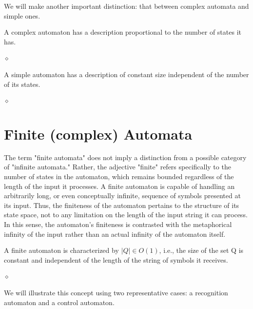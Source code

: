We will make another important distinction: that between complex automata and simple ones.

\begin{definition}
A complex automaton has a description proportional to the number of states it has.

$\diamond$
\end{definition}

\begin{definition}
A simple automaton has a description of constant size independent of the number of its states.

$\diamond$
\end{definition}

\section{Finite (complex) Automata}
The term "finite automata" does not imply a distinction from a possible category of "infinite automata." Rather, the adjective "finite" refers specifically to the number of states in the automaton, which remains bounded regardless of the length of the input it processes. A finite automaton is capable of handling an arbitrarily long, or even conceptually infinite, sequence of symbols presented at its input. Thus, the finiteness of the automaton pertains to the structure of its state space, not to any limitation on the length of the input string it can process. In this sense, the automaton's finiteness is contrasted with the metaphorical infinity of the input rather than an actual infinity of the automaton itself.

\begin{definition}
A finite automaton is characterized by $|Q| \in O(1)$, i.e., the size of the set Q is constant and independent of the length of the string of symbols it receives.

$\diamond$
\end{definition}

We will illustrate this concept using two representative cases: a recognition automaton and a control automaton.

